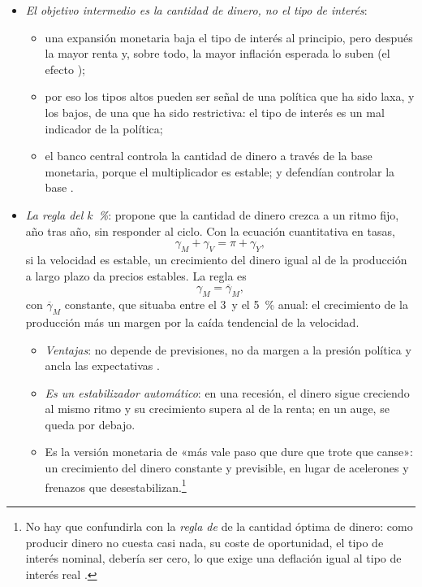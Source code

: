\documentclass[11pt]{article}
\begin{document}
\begin{itemize}
\begin{itemize}
\begin{itemize}
    \end{itemize}
  \item \emph{El objetivo intermedio es la cantidad de dinero, no el tipo de interés}:
    \begin{itemize}
    \item una expansión monetaria baja el tipo de interés al principio, pero después la mayor renta y, sobre todo, la mayor inflación esperada lo suben (el efecto )\nocite{Friedman1968Role};
    \item por eso los tipos altos pueden ser señal de una política que ha sido laxa, y los bajos, de una que ha sido restrictiva: el tipo de interés es un mal indicador de la política;
    \item el banco central controla la cantidad de dinero a través de la base monetaria, porque el multiplicador es estable;  y  defendían controlar la base\nocite{SnowdonVane2005Modern} .
    \end{itemize}
  \item \emph{La regla del $k$~\%}: \textcite{Friedman1960Program} propone que la cantidad de dinero crezca a un ritmo fijo, año tras año, sin responder al ciclo. Con la ecuación cuantitativa en tasas,
  \begin{equation}
  \gamma_M+\gamma_V=\pi+\gamma_Y, \label{eq:cuantitativa}
  \end{equation}
  si la velocidad es estable, un crecimiento del dinero igual al de la producción a largo plazo da precios estables. La regla es
  \begin{equation}
  \gamma_M=\overline{\gamma}_M, \label{eq:regla-k}
  \end{equation}
  con $\overline{\gamma}_M$ constante, que  situaba entre el 3~y el 5~\% anual: el crecimiento de la producción más un margen por la caída tendencial de la velocidad.
    \begin{itemize}
    \item \emph{Ventajas}: no depende de previsiones, no da margen a la presión política y ancla las expectativas .
    \item \emph{Es un estabilizador automático}: en una recesión, el dinero sigue creciendo al mismo ritmo y su crecimiento supera al de la renta; en un auge, se queda por debajo.
    \item Es la versión monetaria de «más vale paso que dure que trote que canse»: un crecimiento del dinero constante y previsible, en lugar de acelerones y frenazos que desestabilizan.\footnote{No hay que confundirla con la \emph{regla de } de la cantidad óptima de dinero\nocite{Friedman1969Optimum}: como producir dinero no cuesta casi nada, su coste de oportunidad, el tipo de interés nominal, debería ser cero, lo que exige una deflación igual al tipo de interés real .}
    \end{itemize}
  \end{itemize}
\end{itemize}
\end{document}
